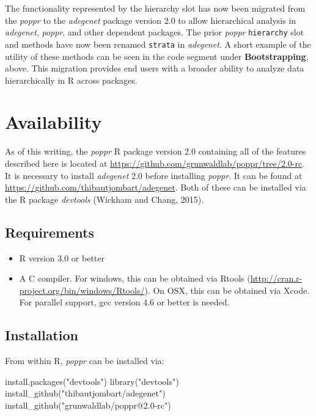 \documentclass{frontiersSCNS} %
\newenvironment{CodeChunk}{}{}
\begin{document}
The functionality represented by the hierarchy slot has now been
migrated from the \emph{poppr} to the \emph{adegenet} package version
2.0 to allow hierarchical analysis in \emph{adegenet}, \emph{poppr}, and
other dependent packages. The prior \emph{poppr} \texttt{hierarchy} slot
and methods have now been renamed \texttt{strata} in \emph{adegenet}. A
short example of the utility of these methods can be seen in the code
segment under \textbf{Bootstrapping}, above. This migration provides end
users with a broader ability to analyze data hierarchically in R across
packages.

\section*{Availability}\label{availability}

As of this writing, the \emph{poppr} R package version 2.0 containing
all of the features described here is located at
\url{https://github.com/grunwaldlab/poppr/tree/2.0-rc}. It is necessary
to install \emph{adegenet} 2.0 before installing \emph{poppr}. It can be
found at \url{https://github.com/thibautjombart/adegenet}. Both of these
can be installed via the R package \emph{devtools} (Wickham and Chang,
2015).

\subsection*{Requirements}\label{requirements}

\begin{itemize}
\itemsep1pt\parskip0pt
\item
  R version 3.0 or better
\item
  A C compiler. For windows, this can be obtained via Rtools
  (\url{http://cran.r-project.org/bin/windows/Rtools/}). On OSX, this
  can be obtained via Xcode. For parallel support, gcc version 4.6 or
  better is needed.
\end{itemize}

\subsection*{Installation}\label{installation}

From within R, \emph{poppr} can be installed via:

\begin{CodeChunk}
\begin{CodeInput}
install.packages("devtools")
library("devtools")
install_github("thibautjombart/adegenet")
install_github("grunwaldlab/poppr@2.0-rc")
\end{CodeInput}
\end{CodeChunk}
\end{document}
